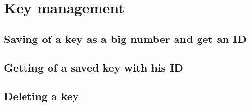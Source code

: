 \chapter{Key management}

\section{Saving of a key as a big number and get an ID}

\section{Getting of a saved key with his ID}

\section{Deleting a key}